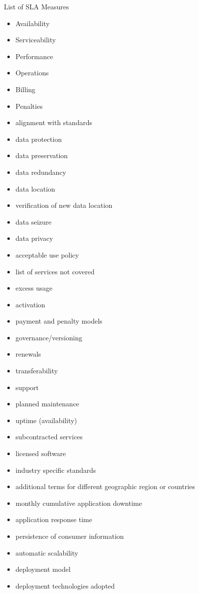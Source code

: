 \documentclass[12pt,a4paper,oneside]{report}
\begin{document}
\begin{center}
\begin{LARGE}
List of SLA Measures
\end{LARGE}
\end{center}

\begin{itemize}
\item Availability
\item Serviceability
\item Performance
\item Operations
\item Billing
\item Penalties
\item alignment with standards
\item data protection
\item data preservation
\item data redundancy
\item data location
\item verification of new data location
\item data seizure
\item data privacy
\item acceptable use policy
\item list of services not covered
\item excess usage
\item activation
\item payment and penalty models
\item governance/versioning
\item renewals
\item transferability
\item support
\item planned maintenance
\item uptime (availability)
\item subcontracted services
\item licensed software
\item industry specific standards
\item additional terms for different geographic region or countries
\item monthly cumulative application downtime
\item application response time
\item persistence of consumer information
\item automatic scalability
\item deployment model
\item deployment technologies adopted

\end{itemize}
\end{document}
